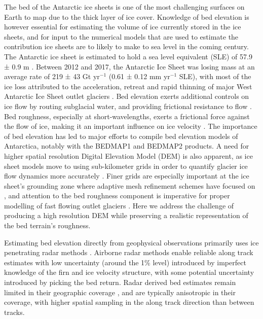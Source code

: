 \documentclass[tc, manuscript]{copernicus}
\begin{document}
The bed of the Antarctic ice sheets is one of the most challenging surfaces on Earth to map due to the thick layer of ice cover.
Knowledge of bed elevation is however essential for estimating the volume of ice currently stored in the ice sheets, and for input to the numerical models that are used to estimate the contribution ice sheets are to likely to make to sea level in the coming century.
The Antarctic ice sheet is estimated to hold a sea level equivalent (SLE) of 57.9 ± 0.9 m \citep{MorlighemDeepglacialtroughs2019}.
Between 2012 and 2017, the Antarctic Ice Sheet was losing mass at an average rate of 219 ± 43 Gt yr$^{-1}$ (0.61 ± 0.12 mm yr$^{-1}$ SLE), with most of the ice loss attributed to the acceleration, retreat and rapid thinning of major West Antarctic Ice Sheet outlet glaciers \citep{TheIMBIEteamMassbalanceAntarctic2018}.
Bed elevation exerts additional controls on ice flow by routing subglacial water, and providing frictional resistance to flow \citep{SiegertMacroscalebedroughness2004}.
Bed roughness, especially at short-wavelengths, exerts a frictional force against the flow of ice, making it an important influence on ice velocity \citep{BinghamDiverselandscapesPine2017,FalciniQuantifyingbedroughness2018}.
The importance of bed elevation has led to major efforts to compile bed elevation models of Antarctica, notably with the BEDMAP1 \citep{LytheBEDMAPnewice2001} and BEDMAP2 \citep{FretwellBedmap2improvedice2013} products.
A need for higher spatial resolution Digital Elevation Model (DEM) is also apparent, as ice sheet models move to using sub-kilometer grids in order to quantify glacier ice flow dynamics more accurately \citep{Grahamhighresolutionsyntheticbed2017}.
Finer grids are especially important at the ice sheet's grounding zone where adaptive mesh refinement schemes have focused on \citep[e.g.][]{CornfordAdaptivemeshrefinement2016}, and attention to the bed roughness component is imperative for proper modelling of fast flowing outlet glaciers \citep{DurandImpactbedrockdescription2011,NiasContrastingmodelledsensitivity2016}.
Here we address the challenge of producing a high resolution DEM while preserving a realistic representation of the bed terrain's roughness.

Estimating bed elevation directly from geophysical observations primarily uses ice penetrating radar methods \citep[e.g.][]{RobinRadioechoexploration1970}.
Airborne radar methods enable reliable along track estimates with low uncertainty (around the 1\% level) introduced by imperfect knowledge of the firn and ice velocity structure, with some potential uncertainty introduced by picking the bed return.
Radar derived bed estimates remain limited in their geographic coverage \citep{FretwellBedmap2improvedice2013}, and are typically anisotropic in their coverage, with higher spatial sampling in the along track direction than between tracks.
\end{document}
